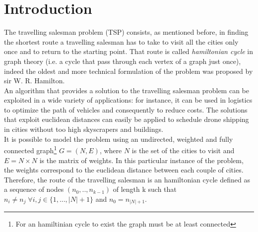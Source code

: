 \documentclass{article}
\begin{document}
\section{Introduction}
The travelling salesman problem (TSP) consists, as mentioned before, in finding the shortest route a travelling salesman has to take to visit all the cities only once and to return to the starting point. That route is called \textit{hamiltonian cycle} in graph theory (i.e. a cycle that pass through each vertex of a graph just once), indeed the oldest and more technical formulation of the problem was proposed by sir W. R. Hamilton. \\
An algorithm that provides a solution to the travelling salesman problem can be exploited in a wide variety of applications: for instance, it can be used in logistics to optimize the path of vehicles and consequently to reduce costs. The solutions that exploit euclidean distances can easily be applied to schedule drone shipping in cities without too high skyscrapers and buildings. \\
It is possible to model the problem using an undirected, weighted and fully connected graph\footnote{For an hamiltinian cycle to exist the graph must be at least connected} $G = (N,E)$, where $N$ is the set of the cities to visit and $E =  N \times N$ is the matrix of weights. In this particular instance of the problem, the weights correspond to the euclidean distance between each couple of cities.\\
Therefore, the route of the travelling salesman is an hamiltonian cycle defined as a sequence of nodes $(n_0, .., n_{k-1})$ of length k such that $n_i \neq n_j \; \forall i,j \in \{1,..., |N|+1\}$ and $n_0 = n_{|N|+1}$. \\
\end{document}
